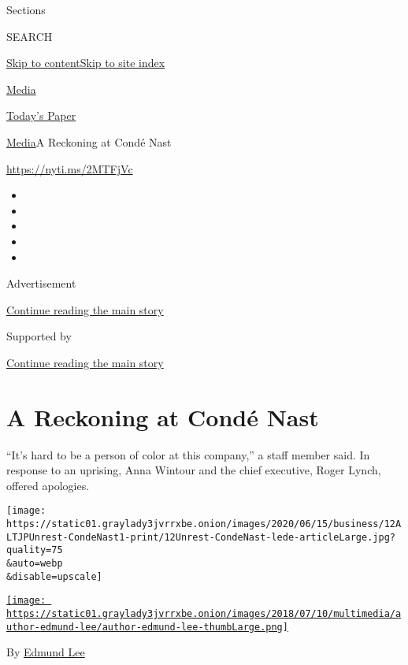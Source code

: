 Sections

SEARCH

\protect\hyperlink{site-content}{Skip to
content}\protect\hyperlink{site-index}{Skip to site index}

\href{https://www.nytimes3xbfgragh.onion/section/business/media}{Media}

\href{https://myaccount.nytimes3xbfgragh.onion/auth/login?response_type=cookie\&client_id=vi}{}

\href{https://www.nytimes3xbfgragh.onion/section/todayspaper}{Today's
Paper}

\href{/section/business/media}{Media}\textbar{}A Reckoning at Condé Nast

\url{https://nyti.ms/2MTFjVc}

\begin{itemize}
\item
\item
\item
\item
\item
\end{itemize}

Advertisement

\protect\hyperlink{after-top}{Continue reading the main story}

Supported by

\protect\hyperlink{after-sponsor}{Continue reading the main story}

\hypertarget{a-reckoning-at-conduxe9-nast}{%
\section{A Reckoning at Condé Nast}\label{a-reckoning-at-conduxe9-nast}}

``It's hard to be a person of color at this company,'' a staff member
said. In response to an uprising, Anna Wintour and the chief executive,
Roger Lynch, offered apologies.

\texttt{[image: https://static01.graylady3jvrrxbe.onion/images/2020/06/15/business/12ALTJPUnrest-CondeNast1-print/12Unrest-CondeNast-lede-articleLarge.jpg?quality=75\\\&auto=webp\\\&disable=upscale]}

\href{https://www.nytimes3xbfgragh.onion/by/edmund-lee}{\texttt{[image: https://static01.graylady3jvrrxbe.onion/images/2018/07/10/multimedia/author-edmund-lee/author-edmund-lee-thumbLarge.png]}}

By \href{https://www.nytimes3xbfgragh.onion/by/edmund-lee}{Edmund Lee}

